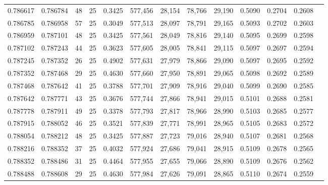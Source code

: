 \begin{tabular}{rrrrrrrrrrrrr}
0.786617 & 0.786784 &    48 &  25 &                                     0.3425 & 577,456 &  28,154 &  78,766 &  29,190 & 0.5090 & 0.2704 & 0.2608 \\
0.786785 & 0.786958 &    57 &  25 &                                     0.3049 & 577,513 &  28,097 &  78,791 &  29,165 & 0.5093 & 0.2702 & 0.2603 \\
0.786959 & 0.787101 &    48 &  25 &                                     0.3425 & 577,561 &  28,049 &  78,816 &  29,140 & 0.5095 & 0.2699 & 0.2598 \\
0.787102 & 0.787243 &    44 &  25 &                                     0.3623 & 577,605 &  28,005 &  78,841 &  29,115 & 0.5097 & 0.2697 & 0.2594 \\
0.787245 & 0.787352 &    26 &  25 &                                     0.4902 & 577,631 &  27,979 &  78,866 &  29,090 & 0.5097 & 0.2695 & 0.2592 \\
0.787352 & 0.787468 &    29 &  25 &                                     0.4630 & 577,660 &  27,950 &  78,891 &  29,065 & 0.5098 & 0.2692 & 0.2589 \\
0.787468 & 0.787642 &    41 &  25 &                                     0.3788 & 577,701 &  27,909 &  78,916 &  29,040 & 0.5099 & 0.2690 & 0.2585 \\
0.787642 & 0.787771 &    43 &  25 &                                     0.3676 & 577,744 &  27,866 &  78,941 &  29,015 & 0.5101 & 0.2688 & 0.2581 \\
0.787778 & 0.787911 &    49 &  25 &                                     0.3378 & 577,793 &  27,817 &  78,966 &  28,990 & 0.5103 & 0.2685 & 0.2577 \\
0.787915 & 0.788052 &    46 &  25 &                                     0.3521 & 577,839 &  27,771 &  78,991 &  28,965 & 0.5105 & 0.2683 & 0.2572 \\
0.788054 & 0.788212 &    48 &  25 &                                     0.3425 & 577,887 &  27,723 &  79,016 &  28,940 & 0.5107 & 0.2681 & 0.2568 \\
0.788216 & 0.788352 &    37 &  25 &                                     0.4032 & 577,924 &  27,686 &  79,041 &  28,915 & 0.5109 & 0.2678 & 0.2565 \\
0.788352 & 0.788486 &    31 &  25 &                                     0.4464 & 577,955 &  27,655 &  79,066 &  28,890 & 0.5109 & 0.2676 & 0.2562 \\
0.788488 & 0.788608 &    29 &  25 &                                     0.4630 & 577,984 &  27,626 &  79,091 &  28,865 & 0.5110 & 0.2674 & 0.2559 \\

\end{tabular}
